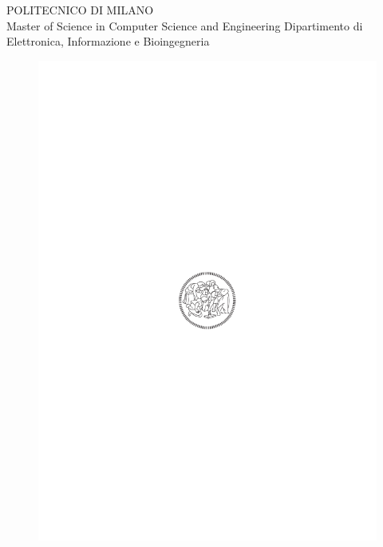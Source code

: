 \thispagestyle{empty}
\vspace*{-1.5cm} 

\bfseries{
\begin{center}

\large
POLITECNICO DI MILANO\\
\normalsize
Master of Science in Computer Science and Engineering
Dipartimento di Elettronica, Informazione e Bioingegneria

 
\vspace{5mm}



\begin{figure}[h]
\begin{center}
\includegraphics{logo_polimi.pdf}
\end{center}
\end{figure}


\end{center}}
